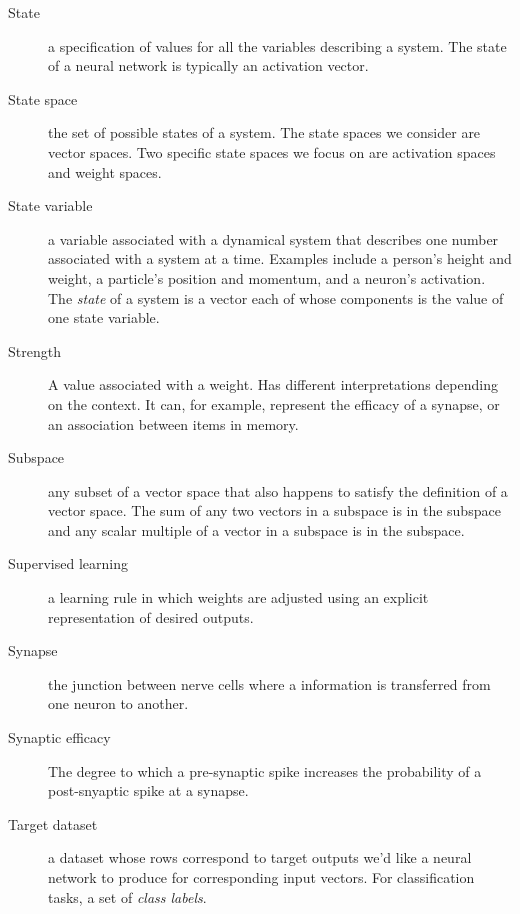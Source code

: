 \begin{description}
\item[State] a specification of values for all the variables describing a system. The state of a neural network is typically an activation vector.

\item[State space] the set of possible states of a system. The state spaces we consider are vector spaces. Two specific state spaces we focus on are activation spaces and weight spaces.

\item[State variable] a variable associated with a dynamical system that describes one number associated with a system at a time. Examples include a person's height and weight, a particle's position and momentum, and a neuron's activation. The \emph{state} of a system is a vector each of whose components is the value of one state variable. 


\item[Strength] A value associated with a weight. Has different interpretations depending on the context. It can, for example, represent the efficacy of a synapse, or an association between items in memory.


\item[Subspace] any subset of a vector space that also happens to satisfy the definition of a vector space. The sum of any two vectors in a subspace is in the subspace and any scalar multiple of a vector in a subspace is in the subspace.

\item[Supervised learning] a learning rule in which weights are adjusted using an explicit representation of desired outputs.


\item[Synapse] the junction between nerve cells where a information is transferred from one neuron to another.

\item[Synaptic efficacy] The degree to which a pre-synaptic spike increases the probability of a post-snyaptic spike at a synapse.

\item[Target dataset] a dataset whose rows correspond to target outputs we'd like a neural network to produce for corresponding input vectors. For classification tasks, a set of \emph{class labels}.


\end{description}
